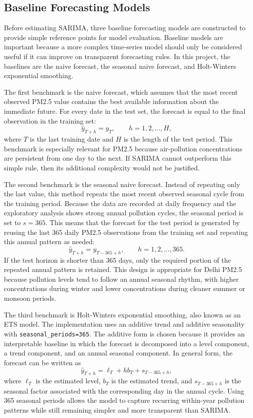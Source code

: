 \documentclass[11pt]{article}
\newcommand{\subheading}[1]{%
  \phantomsection%
  \subsection*{#1}%
  \addcontentsline{toc}{subsection}{#1}%
}
\begin{document}
\subheading{Baseline Forecasting Models}
Before estimating SARIMA, three baseline forecasting models are constructed to provide simple reference points for model evaluation. Baseline models are important because a more complex time-series model should only be considered useful if it can improve on transparent forecasting rules. In this project, the baselines are the naive forecast, the seasonal naive forecast, and Holt-Winters exponential smoothing.

The first benchmark is the naive forecast, which assumes that the most recent observed PM2.5 value contains the best available information about the immediate future. For every date in the test set, the forecast is equal to the final observation in the training set:
\[
\hat{y}_{T+h}=y_T, \qquad h=1,2,\ldots,H,
\]
where $T$ is the last training date and $H$ is the length of the test period. This benchmark is especially relevant for PM2.5 because air-pollution concentrations are persistent from one day to the next. If SARIMA cannot outperform this simple rule, then its additional complexity would not be justified.

The second benchmark is the seasonal naive forecast. Instead of repeating only the last value, this method repeats the most recent observed seasonal cycle from the training period. Because the data are recorded at daily frequency and the exploratory analysis shows strong annual pollution cycles, the seasonal period is set to $s=365$. This means that the forecast for the test period is generated by reusing the last 365 daily PM2.5 observations from the training set and repeating this annual pattern as needed:
\[
\hat{y}_{T+h}=y_{T-365+h}, \qquad h=1,2,\ldots,365.
\]
If the test horizon is shorter than 365 days, only the required portion of the repeated annual pattern is retained. This design is appropriate for Delhi PM2.5 because pollution levels tend to follow an annual seasonal rhythm, with higher concentrations during winter and lower concentrations during cleaner summer or monsoon periods.

The third benchmark is Holt-Winters exponential smoothing, also known as an ETS model. The implementation uses an additive trend and additive seasonality with \texttt{seasonal\_periods=365}. The additive form is chosen because it provides an interpretable baseline in which the forecast is decomposed into a level component, a trend component, and an annual seasonal component. In general form, the forecast can be written as
\[
\hat{y}_{T+h}=\ell_T + hb_T + s_{T-365+h},
\]
where $\ell_T$ is the estimated level, $b_T$ is the estimated trend, and $s_{T-365+h}$ is the seasonal factor associated with the corresponding day in the annual cycle. Using 365 seasonal periods allows the model to capture recurring within-year pollution patterns while still remaining simpler and more transparent than SARIMA.
\end{document}
